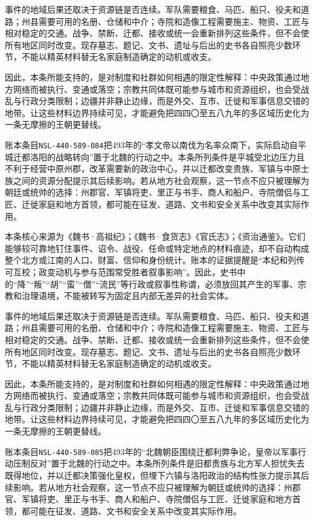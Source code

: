 事件的地域后果还取决于资源链是否连续。军队需要粮食、马匹、船只、役夫和道路；州县需要可用的名册、仓储和中介；寺院和造像工程需要施主、物资、工匠与相对稳定的交通。战争、禁断、迁都、接收或统一会重新排列这些条件，但不会使所有地区同时改变。现存墓志、题记、文书、遗址与后出的史书各自照亮少数环节，不能以精英材料替无名家庭制造确定的动机或收支。

因此，本条所能支持的，是对制度和社群如何相遇的限定性解释：中央政策通过地方网络而被执行、变通或落空；宗教共同体既可能参与城市和资源组织，也会受战乱与行政分类限制；边疆并非静止边缘，而是外交、互市、迁徙和军事信息交错的地带。让这些材料边界持续可见，才能避免把四四〇至五八九年的多区域历史化为一条无摩擦的王朝更替线。

账本条目\texttt{NSL-440-589-084}把493年的“孝文帝以南伐为名率众南下，实际启动自平城迁都洛阳的战略转向”置于北魏的行动之中。本条所列条件是平城受北边压力且不利于经营中原州郡，改革需要新的政治中心，并以迁都改变贵族、军镇与中原士族之间的资源分配提示其后续影响。若从地方社会观察，这一节点不应只被理解为朝廷或统帅的选择：州郡官、军镇将吏、里正与书手、商人和船户、寺院僧侣与工匠、迁徙家庭和地方首领，都可能在征发、道路、文书和安全关系中改变其实际作用。

本条核心来源为《魏书·高祖纪》；《魏书·食货志》《官氏志》；《资治通鉴》。它们能够较可靠地钉住事件、诏令、战役、任命或特定地点的材料痕迹，却不自动构成整个北方或江南的人口、财富、信仰和身份统计。账本的证据提醒是“本纪和列传可互校；政变动机与参与范围常受胜者叙事影响”。因此，史书中的“降”“叛”“胡”“蛮”“僧”“流民”等行政或叙事性称谓，必须放回其产生的军事、宗教和治理语境，不能被转写为固定且内部无差异的社会实体。

事件的地域后果还取决于资源链是否连续。军队需要粮食、马匹、船只、役夫和道路；州县需要可用的名册、仓储和中介；寺院和造像工程需要施主、物资、工匠与相对稳定的交通。战争、禁断、迁都、接收或统一会重新排列这些条件，但不会使所有地区同时改变。现存墓志、题记、文书、遗址与后出的史书各自照亮少数环节，不能以精英材料替无名家庭制造确定的动机或收支。

因此，本条所能支持的，是对制度和社群如何相遇的限定性解释：中央政策通过地方网络而被执行、变通或落空；宗教共同体既可能参与城市和资源组织，也会受战乱与行政分类限制；边疆并非静止边缘，而是外交、互市、迁徙和军事信息交错的地带。让这些材料边界持续可见，才能避免把四四〇至五八九年的多区域历史化为一条无摩擦的王朝更替线。

账本条目\texttt{NSL-440-589-085}把493年的“北魏朝臣围绕迁都利弊争论，皇帝以军事行动压制反对”置于北魏的行动之中。本条所列条件是旧都贵族与北方军人担忧失去既得地位，并以迁都决策强化皇权，但埋下六镇与洛阳政治的结构性张力提示其后续影响。若从地方社会观察，这一节点不应只被理解为朝廷或统帅的选择：州郡官、军镇将吏、里正与书手、商人和船户、寺院僧侣与工匠、迁徙家庭和地方首领，都可能在征发、道路、文书和安全关系中改变其实际作用。

